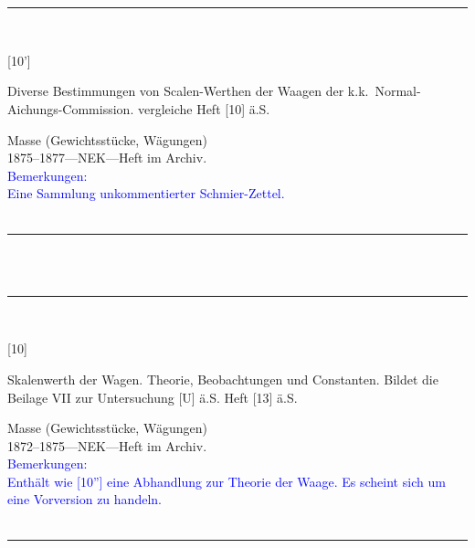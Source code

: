 \\
\vspace*{-2.5pt}\\
\parbox{\textwidth}{%
\rule{\textwidth}{1pt}\vspace*{-3mm}\\
\begin{minipage}[t]{0.2\textwidth}\vspace{0pt}
\Huge\rule[-4mm]{0cm}{1cm}[10']
\end{minipage}
\hfill
\begin{minipage}[t]{0.8\textwidth}\vspace{0pt}
\large Diverse Bestimmungen von Scalen-Werthen der Waagen der k.k.\ Normal-Aichungs-Commission. vergleiche Heft [10] ä.S.\rule[-2mm]{0mm}{2mm}
\end{minipage}
{\footnotesize\flushright
Masse (Gewichtsstücke, Wägungen)\\
}
1875--1877\quad---\quad NEK\quad---\quad Heft im Archiv.\\
\textcolor{blue}{Bemerkungen:\\{}
Eine Sammlung unkommentierter Schmier-Zettel.\\{}
}
\\[-15pt]
\rule{\textwidth}{1pt}
}
\\
\vspace*{-2.5pt}\\
\parbox{\textwidth}{%
\rule{\textwidth}{1pt}\vspace*{-3mm}\\
\begin{minipage}[t]{0.15\textwidth}\vspace{0pt}
\Huge\rule[-4mm]{0cm}{1cm}[10]
\end{minipage}
\hfill
\begin{minipage}[t]{0.85\textwidth}\vspace{0pt}
\large Skalenwerth der Wagen. Theorie, Beobachtungen und Constanten. Bildet die Beilage VII zur Untersuchung [U] ä.S. Heft [13] ä.S.\rule[-2mm]{0mm}{2mm}
\end{minipage}
{\footnotesize\flushright
Masse (Gewichtsstücke, Wägungen)\\
}
1872--1875\quad---\quad NEK\quad---\quad Heft im Archiv.\\
\textcolor{blue}{Bemerkungen:\\{}
Enthält wie [10''] eine Abhandlung zur Theorie der Waage. Es scheint sich um eine Vorversion zu handeln.\\{}
}
\\[-15pt]
\rule{\textwidth}{1pt}
}
